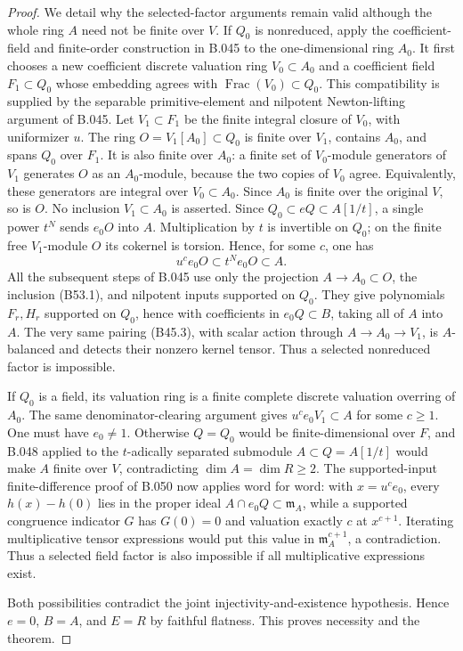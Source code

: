 \begin{proof}
We detail why the selected-factor arguments remain
valid although the whole ring $A$ need not be
finite over $V$. If $Q_0$ is nonreduced, apply
the coefficient-field and finite-order construction
in B.045 to the one-dimensional ring $A_0$.
It first chooses a new coefficient discrete valuation
ring $V_0\subset A_0$ and a coefficient field
$F_1\subset Q_0$ whose embedding agrees with
$\operatorname{Frac}(V_0)\subset Q_0$. This compatibility
is supplied by the separable primitive-element and
nilpotent Newton-lifting argument of B.045.
Let $V_1\subset F_1$ be the finite integral closure
of $V_0$, with uniformizer $u$. The ring
$O=V_1[A_0]\subset Q_0$ is finite over $V_1$,
contains $A_0$, and spans $Q_0$ over $F_1$.
It is also finite over $A_0$: a finite set of
$V_0$-module generators of $V_1$ generates $O$
as an $A_0$-module, because the two copies of
$V_0$ agree. Equivalently, these generators are
integral over $V_0\subset A_0$. Since $A_0$ is
finite over the original $V$, so is $O$.
No inclusion $V_1\subset A_0$ is asserted.
Since $Q_0\subset eQ\subset A[1/t]$, a single
power $t^N$ sends $e_0O$ into $A$.
Multiplication by $t$ is invertible on $Q_0$;
on the finite free $V_1$-module $O$ its cokernel
is torsion. Hence, for some $c$, one has
\[
                        u^ce_0O\subset t^Ne_0O\subset A.
                                                               \tag{B53.1}
\]
All the subsequent steps of B.045 use only the
projection $A\to A_0\subset O$, the inclusion
(B53.1), and nilpotent inputs supported on $Q_0$.
They give polynomials $F_r,H_r$ supported on
$Q_0$, hence with coefficients in
$e_0Q\subset B$, taking all of $A$ into $A$.
The very same pairing (B45.3), with scalar action
through $A\to A_0\to V_1$, is $A$-balanced and
detects their nonzero kernel tensor.
Thus a selected nonreduced factor is impossible.

If $Q_0$ is a field, its valuation ring is a
finite complete discrete valuation overring of
$A_0$. The same denominator-clearing argument
gives $u^ce_0V_1\subset A$ for some $c\ge1$.
One must have $e_0\ne1$. Otherwise $Q=Q_0$
would be finite-dimensional over $F$, and B.048
applied to the $t$-adically separated submodule
$A\subset Q=A[1/t]$ would make $A$ finite
over $V$, contradicting $\dim A=\dim R\ge2$.
The supported-input finite-difference proof of
B.050 now applies word for word: with
$x=u^ce_0$, every $h(x)-h(0)$ lies in the
proper ideal $A\cap e_0Q\subset\mathfrak m_A$,
while a supported congruence indicator $G$ has
$G(0)=0$ and valuation exactly $c$ at
$x^{c+1}$. Iterating multiplicative tensor
expressions would put this value in
$\mathfrak m_A^{c+1}$, a contradiction.
Thus a selected field factor is also impossible
if all multiplicative expressions exist.

Both possibilities contradict the joint
injectivity-and-existence hypothesis. Hence
$e=0$, $B=A$, and $E=R$ by faithful flatness.
This proves necessity and the theorem.
\end{proof}

